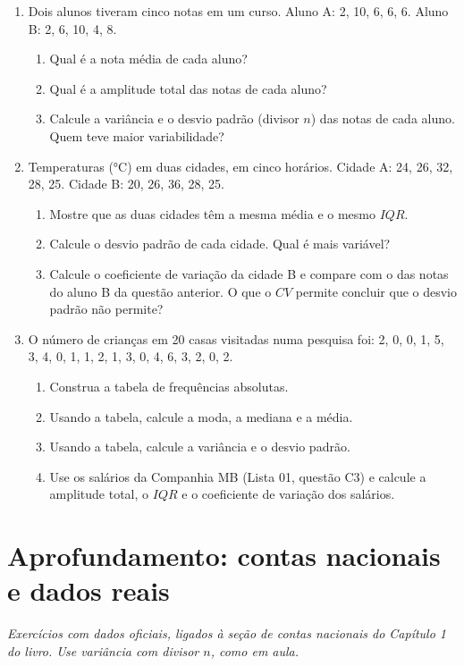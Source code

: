 \documentclass[11pt]{article}
\begin{document}
\begin{enumerate}[label=\textbf{C\arabic*.}, leftmargin=*]
\item Dois alunos tiveram cinco notas em um curso. Aluno A: 2, 10, 6, 6, 6. Aluno B: 2, 6, 10, 4, 8.
\begin{enumerate}[label=(\alph*)]
  \item Qual é a nota média de cada aluno?
  \item Qual é a amplitude total das notas de cada aluno?
  \item Calcule a variância e o desvio padrão (divisor $n$) das notas de cada aluno. Quem teve maior variabilidade?
\end{enumerate}
\item Temperaturas (°C) em duas cidades, em cinco horários. Cidade A: 24, 26, 32, 28, 25. Cidade B: 20, 26, 36, 28, 25.
\begin{enumerate}[label=(\alph*)]
  \item Mostre que as duas cidades têm a mesma média e o mesmo $IQR$.
  \item Calcule o desvio padrão de cada cidade. Qual é mais variável?
  \item Calcule o coeficiente de variação da cidade B e compare com o das notas do aluno B da questão anterior. O que o $CV$ permite concluir que o desvio padrão não permite?
\end{enumerate}
\item O número de crianças em 20 casas visitadas numa pesquisa foi: 2, 0, 0, 1, 5, 3, 4, 0, 1, 1, 2, 1, 3, 0, 4, 6, 3, 2, 0, 2.
\begin{enumerate}[label=(\alph*)]
  \item Construa a tabela de frequências absolutas.
  \item Usando a tabela, calcule a moda, a mediana e a média.
  \item Usando a tabela, calcule a variância e o desvio padrão.
  \item Use os salários da Companhia MB (Lista 01, questão C3) e calcule a amplitude total, o $IQR$ e o coeficiente de variação dos salários.
\end{enumerate}

\end{enumerate}

\bigskip
{}
\section*{Aprofundamento: contas nacionais e dados reais}
\noindent\textit{Exercícios com dados oficiais, ligados à seção de contas nacionais do Capítulo 1 do livro. Use variância com divisor $n$, como em aula.}
\end{document}
